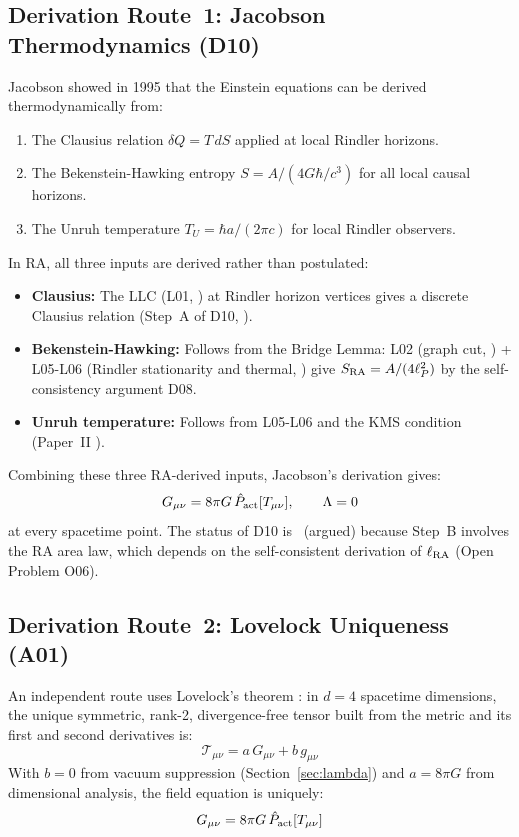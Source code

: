 \documentclass[12pt,a4paper]{article}
\begin{document}
\subsection{Derivation Route~1: Jacobson Thermodynamics (D10)}

Jacobson \cite{Jacobson1995} showed in 1995 that the Einstein equations can be derived thermodynamically from:
\begin{enumerate}
  \item The Clausius relation $\delta Q = T\,dS$ applied at local Rindler horizons.
  \item The Bekenstein-Hawking entropy $S = A/(4G\hbar/c^3)$ for all local causal horizons.
  \item The Unruh temperature $T_U = \hbar a/(2\pi c)$ for local Rindler observers.
\end{enumerate}

In RA, all three inputs are derived rather than postulated:
\begin{itemize}
  \item \textbf{Clausius:} The LLC (L01, \statusLV) at Rindler horizon vertices gives a discrete Clausius relation (Step~A of D10, \statusAR).
  \item \textbf{Bekenstein-Hawking:} Follows from the Bridge Lemma: L02 (graph cut, \statusLV) + L05-L06 (Rindler stationarity and thermal, \statusLV) give $S_{\rm RA} = A/(4\ell_P^2)$ by the self-consistency argument D08.
  \item \textbf{Unruh temperature:} Follows from L05-L06 and the KMS condition (Paper~II \cite{RA_P2}).
\end{itemize}

Combining these three RA-derived inputs, Jacobson's derivation gives:
\begin{equation}
  G_{\mu\nu} = 8\pi G\,\hat{P}_{\mathrm{act}}[T_{\mu\nu}], \qquad \Lambda = 0
  \label{eq:GR_jacobson}
\end{equation}
at every spacetime point.  The status of D10 is \statusAR\ (argued) because Step~B involves the RA area law, which depends on the self-consistent derivation of $\ell_{\rm RA}$ (Open Problem O06).

\subsection{Derivation Route~2: Lovelock Uniqueness (A01)}

An independent route uses Lovelock's theorem \cite{Lovelock1971}: in $d=4$ spacetime dimensions, the unique symmetric, rank-2, divergence-free tensor built from the metric and its first and second derivatives is:
\begin{equation}
  \mathcal{T}_{\mu\nu} = a\,G_{\mu\nu} + b\,g_{\mu\nu}
\end{equation}
With $b=0$ from vacuum suppression (Section~\ref{sec:lambda}) and $a=8\pi G$ from dimensional analysis, the field equation is uniquely:
\begin{equation}
  G_{\mu\nu} = 8\pi G\,\hat{P}_{\mathrm{act}}[T_{\mu\nu}]
  \label{eq:GR_lovelock}
\end{equation}
\end{document}
